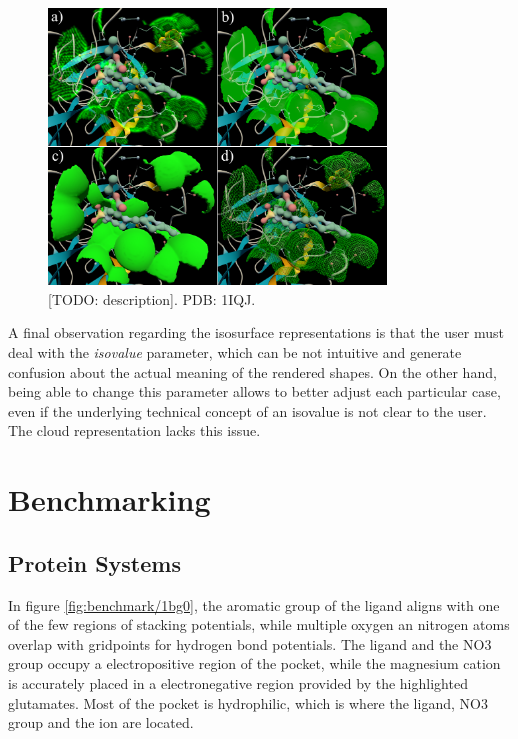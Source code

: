     \begin{figure}[H]
      \centering
      \includegraphics[width=0.8\textwidth]{figures/results/reprs_2.png}
      \caption{\label{fig:results/reprs_2} [TODO: description]. PDB: 1IQJ.}
    \end{figure}

    A final observation regarding the isosurface representations is that the user must deal with the \textit{isovalue} parameter, which can be not intuitive and generate confusion about the actual meaning of the rendered shapes. On the other hand, being able to change this parameter allows to better adjust each particular case, even if the underlying technical concept of an isovalue is not clear to the user. The cloud representation lacks this issue.

\section{Benchmarking}
  \subsection{Protein Systems}
    In figure \ref{fig:benchmark/1bg0}, the aromatic group of the ligand aligns with one of the few regions of stacking potentials, while multiple oxygen an nitrogen atoms overlap with gridpoints for hydrogen bond potentials. The ligand and the NO3 group occupy a electropositive region of the pocket, while the magnesium cation is accurately placed in a electronegative region provided by the highlighted glutamates. Most of the pocket is hydrophilic, which is where the ligand, NO3 group and the ion are located.


